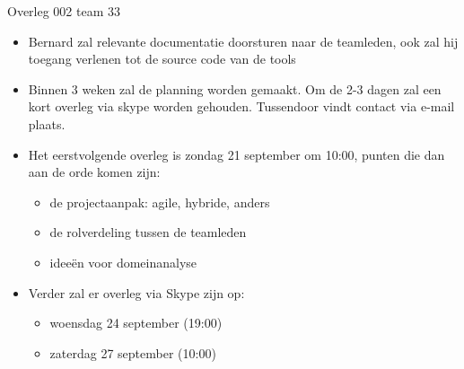 \documentclass{article}
\begin{document}
\begin{Minutes}{Overleg 002 team 33}

\begin{itemize}
 \item Bernard zal relevante documentatie doorsturen naar de teamleden, ook zal hij toegang verlenen tot de source code van de tools
 \item Binnen 3 weken zal de planning worden gemaakt. Om de 2-3 dagen zal een kort overleg via skype worden gehouden. Tussendoor vindt contact via e-mail plaats.
 \item Het eerstvolgende overleg is zondag 21 september om 10:00, punten die dan aan de orde komen zijn:
 \begin{itemize}
  \item de projectaanpak: agile, hybride, anders
  \item de rolverdeling tussen de teamleden
  \item ideeën voor domeinanalyse
 \end{itemize}
 \item Verder zal er overleg via Skype zijn op:
 \begin{itemize}
  \item woensdag 24 september (19:00)
  \item zaterdag 27 september (10:00)
 \end{itemize}


\end{itemize}

\end{Minutes}
\end{document}

